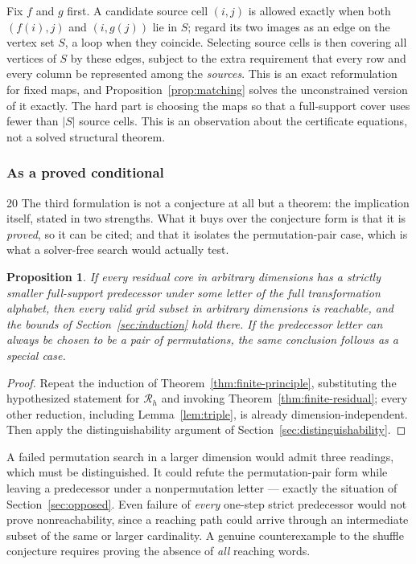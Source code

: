 \documentclass[11pt,letterpaper]{article}
\numberwithin{equation}{section}
\newtheorem{proposition}[theorem]{Proposition}
\theoremstyle{definition}
\theoremstyle{remark}
\begin{document}
Fix $f$ and $g$ first. A candidate source cell $(i,j)$ is allowed exactly
when both $(f(i),j)$ and $(i,g(j))$ lie in $S$; regard its two images as an
edge on the vertex set $S$, a loop when they coincide. Selecting source cells
is then covering all vertices of $S$ by these edges, subject to the extra
requirement that every row and every column be represented among the
\emph{sources}. This is an exact reformulation for fixed maps, and
Proposition~\ref{prop:matching} solves the unconstrained version of it
exactly. The hard part is choosing the maps so that a full-support cover uses
fewer than $|S|$ source cells. This is an observation about the certificate
equations, not a solved structural theorem.

\subsubsection{As a proved conditional}
\begin{variantbox}{20}
The third formulation is not a conjecture at all but a theorem: the
implication itself, stated in two strengths. What it buys over the conjecture
form is that it is \emph{proved}, so it can be cited; and that it isolates
the permutation-pair case, which is what a solver-free search would actually
test.
\end{variantbox}

\begin{proposition}\label{prop:general}
If every residual core in arbitrary dimensions has a strictly smaller
full-support predecessor under some letter of the full transformation
alphabet, then every valid grid subset in arbitrary dimensions is reachable,
and the bounds of Section~\ref{sec:induction} hold there. If the predecessor
letter can always be chosen to be a pair of permutations, the same conclusion
follows as a special case.
\end{proposition}
\begin{proof}
Repeat the induction of Theorem~\ref{thm:finite-principle}, substituting the
hypothesized statement for $\mathcal R_h$ and invoking
Theorem~\ref{thm:finite-residual}; every other reduction, including
Lemma~\ref{lem:triple}, is already dimension-independent. Then apply the
distinguishability argument of Section~\ref{sec:distinguishability}.
\end{proof}

A failed permutation search in a larger dimension would admit three readings,
which must be distinguished. It could refute the permutation-pair form while
leaving a predecessor under a nonpermutation letter --- exactly the situation
of Section~\ref{sec:opposed}. Even failure of \emph{every} one-step strict
predecessor would not prove nonreachability, since a reaching path could
arrive through an intermediate subset of the same or larger cardinality. A
genuine counterexample to the shuffle conjecture requires proving the absence
of \emph{all} reaching words.
\end{document}
